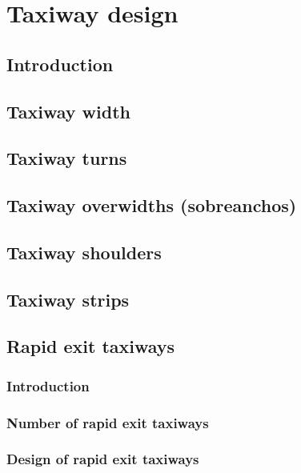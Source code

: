 \chapter{Taxiway design}
	
	\section{Introduction}
	
	\section{Taxiway width}
	
	\section{Taxiway turns}
	
	\section{Taxiway overwidths (sobreanchos)}
	
	\section{Taxiway shoulders}
	
	\section{Taxiway strips}
	
	\section{Rapid exit taxiways}
		\subsection{Introduction}
		\subsection{Number of rapid exit taxiways}
		\subsection{Design of rapid exit taxiways}
